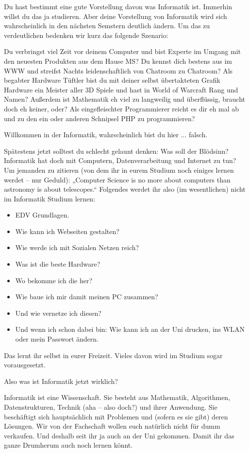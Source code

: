 \spaltenanfang
Du hast bestimmt eine gute Vorstellung davon was Informatik ist. Immerhin willst du das ja studieren. Aber deine Vorstellung von Informatik wird sich wahrscheinlich in den n\"achsten Semstern deutlich \"andern.
Um das zu verdeutlichen bedenken wir kurz das folgende Szenario:

Du verbringst viel Zeit vor deinem Computer und bist Experte im Umgang mit den neuesten Produkten aus dem Hause MS? Du kennst dich bestens aus im WWW und streifst Nachts leidenschaftlich von Chatroom zu Chatroom? Als begabter Hardware Tüftler bist du mit deiner selbst übertakteten Grafik Hardware ein Meister aller 3D Spiele und hast in World of Warcraft Rang und Namen? Außerdem ist Mathematik eh viel zu langweilig und überflüssig, braucht doch eh keiner, oder? Als eingefleischter Programmierer reicht es dir eh mal ab und zu den ein oder anderen Schnipsel PHP zu programmieren?

Willkommen in der Informatik, wahrscheinlich bist du hier ... falsch.


Spätestens jetzt solltest du schlecht gelaunt denken:
Was soll der Blödsinn? Informatik hat doch mit Computern, Datenverarbeitung 
und Internet zu tun? Um jemanden zu zitieren (von dem ihr in eurem Studium noch
einiges lernen werdet – nur Geduld): „Computer Science is no more about
computers than astronomy is about telescopes.“ Folgendes werdet ihr also (im
wesentlichen) nicht im Informatik Studium lernen:

\begin{itemize}
     \item EDV Grundlagen.
     \item Wie kann ich Webseiten gestalten?
     \item Wie werde ich mit Sozialen Netzen reich?
     \item Was ist die beste Hardware?
     \item Wo bekomme ich die her?
     \item Wie baue ich mir damit meinen PC zusammen?
     \item Und wie vernetze ich diesen?
     \item Und wenn ich schon dabei bin: Wie kann ich an der Uni drucken, ins WLAN oder mein Passwort \"andern.
\end{itemize}

Das lernt ihr selbst in eurer Freizeit. Vieles davon wird im Studium sogar vorausgesetzt.

Also was ist Informatik jetzt wirklich?

Informatik ist eine Wissenschaft. Sie besteht aus Mathematik, Algorithmen,
Datenstrukturen, Technik (aha – also doch?) und ihrer Anwendung. Sie
beschäftigt sich hauptsächlich mit Problemen und (sofern es sie gibt) deren
Lösungen. Wir von der Fachschaft wollen euch natürlich nicht für dumm
verkaufen. Und deshalb seit ihr ja auch an der Uni gekommen. Damit ihr das ganze Drumherum auch noch lernen k\"onnt.

\spaltenende
